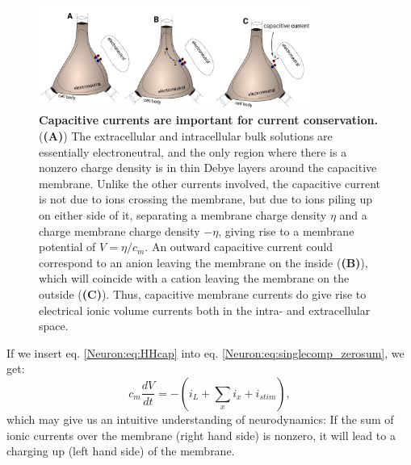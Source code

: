 \begin{figure}[!ht]
\begin{center}
\includegraphics[width=0.8\textwidth]{Figures/Neuron/capacitive_currents.pdf}
\end{center}
\caption{\textbf{Capacitive currents are important for current conservation.}  (\textbf{(A)}) The extracellular and intracellular bulk solutions are essentially electroneutral, and the only region where there is a nonzero charge density is in thin Debye layers around the capacitive membrane. Unlike the other currents involved, the capacitive current is not due to ions crossing the membrane, but due to ions piling up on either side of it, separating a membrane charge density $\eta$ and a charge membrane charge density $-\eta$, giving rise to a membrane potential of $V = \eta/c_m$. An outward capacitive current could correspond to an anion leaving the membrane on the inside (\textbf{(B)}), which will coincide with a cation leaving the membrane on the outside (\textbf{(C)}). Thus, capacitive membrane currents do give rise to electrical ionic volume currents both in the intra- and extracellular space.
}
\label{Neuron:fig:capacitive_currents}
\end{figure}

If we insert eq. \ref{Neuron:eq:HHcap} into eq. \ref{Neuron:eq:singlecomp_zerosum}, we get:
\begin{equation}
c_m \frac{dV}{dt} = - (i_L + \sum_x{i_x} +  i_{stim}),
\label{Neuron:eq:singlecomp_capinserted}
\end{equation}
which may give us an intuitive understanding of neurodynamics: If the sum of ionic currents over the membrane (right hand side) is nonzero, it will lead to a charging up (left hand side) of the membrane. 


\subsection{}
\label{sec:Neuron:leak}

